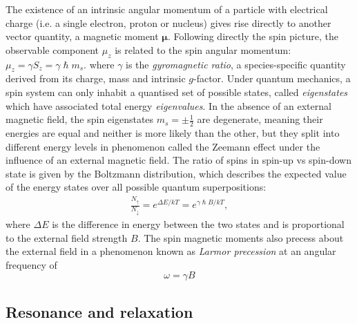 The existence of an intrinsic angular momentum of a particle with electrical charge (i.e. a single electron, proton or nucleus) gives rise directly to another vector quantity, a magnetic moment $\bm{\mu}$.
Following directly the spin picture, the observable component $\mu_z$ is related to the spin angular momentum: $\mu_z = \gamma S_z = \gamma \hslash m_s $.
where $\gamma$ is the \textit{gyromagnetic ratio}, a species-specific quantity derived from its charge, mass and intrinsic $g$-factor.
Under quantum mechanics, a spin system can only inhabit a quantised set of possible states, called \textit{eigenstates} which have associated total energy \textit{eigenvalues}.
In the absence of an external magnetic field, the spin eigenstates $m_s = \pm \frac{1}{2}$ are degenerate, meaning their energies are equal and neither is more likely than the other, but they split into different energy levels in phenomenon called the Zeemann effect under the influence of an external magnetic field.
The ratio of spins in spin-up vs spin-down state is given by the Boltzmann distribution, which describes the expected value of the energy states over all possible quantum superpositions:
\begin{align}
  \frac{N_{\uparrow}}{N_{\downarrow}} = e^{\Delta E / k T} = e^{\gamma \hslash B / k T}, \label{eq:boltzmann}
\end{align}
where $\Delta E$ is the difference in energy between the two states and is proportional to the external field strength $B$.
The spin magnetic moments also precess about the external field in a phenomenon known as \textit{Larmor precession} at an angular frequency of
\begin{equation}
  \omega = \gamma B
\end{equation}

\subsection{Resonance and relaxation}

%
%

